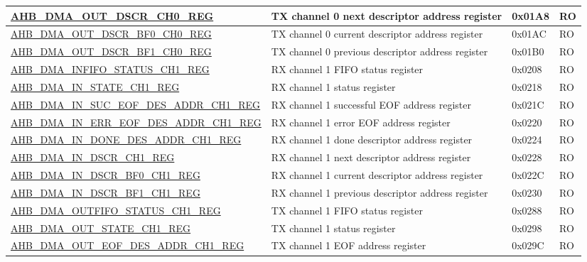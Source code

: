 \begin{longtable}{ | l | p{10cm} | p{1.3cm} | l | }
\hyperref[regdesc:AHBDMAOUTDSCRCHNREG]{AHB\_DMA\_OUT\_DSCR\_CH0\_REG} & TX channel 0 next descriptor address register & 0x01A8 & RO \\ \hline
\hyperref[regdesc:AHBDMAOUTDSCRBF0CHNREG]{AHB\_DMA\_OUT\_DSCR\_BF0\_CH0\_REG} & TX channel 0 current descriptor address register & 0x01AC & RO \\ \hline
\hyperref[regdesc:AHBDMAOUTDSCRBF1CHNREG]{AHB\_DMA\_OUT\_DSCR\_BF1\_CH0\_REG} & TX channel 0 previous descriptor address register & 0x01B0 & RO \\ \hline
\hyperref[regdesc:AHBDMAINFIFOSTATUSCHNREG]{AHB\_DMA\_INFIFO\_STATUS\_CH1\_REG} & RX channel 1 FIFO status register & 0x0208 & RO \\ \hline
\hyperref[regdesc:AHBDMAINSTATECHNREG]{AHB\_DMA\_IN\_STATE\_CH1\_REG} & RX channel 1 status register & 0x0218 & RO \\ \hline
\hyperref[regdesc:AHBDMAINSUCEOFDESADDRCHNREG]{AHB\_DMA\_IN\_SUC\_EOF\_DES\_ADDR\_CH1\_REG} & RX channel 1 successful EOF address register & 0x021C & RO \\ \hline
\hyperref[regdesc:AHBDMAINERREOFDESADDRCHNREG]{AHB\_DMA\_IN\_ERR\_EOF\_DES\_ADDR\_CH1\_REG} & RX channel 1 error EOF address register & 0x0220 & RO \\ \hline
\hyperref[regdesc:AHBDMAINDONEDESADDRCHNREG]{AHB\_DMA\_IN\_DONE\_DES\_ADDR\_CH1\_REG} & RX channel 1 done descriptor address register & 0x0224 & RO \\ \hline
\hyperref[regdesc:AHBDMAINDSCRCHNREG]{AHB\_DMA\_IN\_DSCR\_CH1\_REG} & RX channel 1 next descriptor address register & 0x0228 & RO \\ \hline
\hyperref[regdesc:AHBDMAINDSCRBF0CHNREG]{AHB\_DMA\_IN\_DSCR\_BF0\_CH1\_REG} & RX channel 1 current descriptor address register & 0x022C & RO \\ \hline
\hyperref[regdesc:AHBDMAINDSCRBF1CHNREG]{AHB\_DMA\_IN\_DSCR\_BF1\_CH1\_REG} & RX channel 1 previous descriptor address register & 0x0230 & RO \\ \hline
\hyperref[regdesc:AHBDMAOUTFIFOSTATUSCHNREG]{AHB\_DMA\_OUTFIFO\_STATUS\_CH1\_REG} & TX channel 1 FIFO status register & 0x0288 & RO \\ \hline
\hyperref[regdesc:AHBDMAOUTSTATECHNREG]{AHB\_DMA\_OUT\_STATE\_CH1\_REG} & TX channel 1 status register & 0x0298 & RO \\ \hline
\hyperref[regdesc:AHBDMAOUTEOFDESADDRCHNREG]{AHB\_DMA\_OUT\_EOF\_DES\_ADDR\_CH1\_REG} & TX channel 1 EOF address register & 0x029C & RO \\ \hline

\end{longtable}
